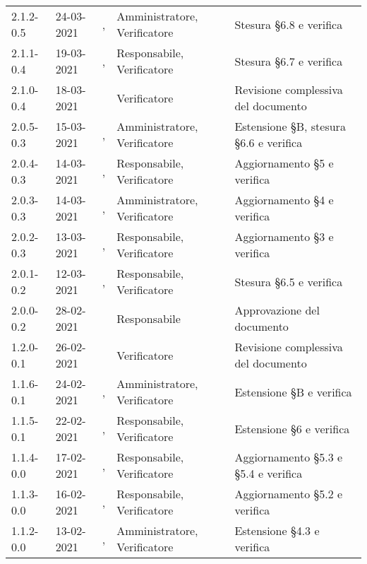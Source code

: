 {{\begin{longtable}{C{1.7cm} | C{2.2cm} | C{3.2cm} | C{3cm} | C{4.8cm}}
2.1.2-0.5 & 24-03-2021 & \PA{}, \BM{} & Amministratore, Verificatore & Stesura \S 6.8 e verifica\\

2.1.1-0.4 & 19-03-2021 & \SH{}, \BM{} & Responsabile, Verificatore & Stesura \S 6.7 e verifica\\

2.1.0-0.4 & 18-03-2021 & \BM{} & Verificatore & Revisione complessiva del documento\\

2.0.5-0.3 & 15-03-2021 & \SG{}, \RA{} & Amministratore, Verificatore & Estensione \S B, stesura \S 6.6 e verifica\\

2.0.4-0.3 & 14-03-2021 & \ZM{}, \BM{} & Responsabile, Verificatore & Aggiornamento \S 5 e verifica\\

2.0.3-0.3 & 14-03-2021 & \BM{}, \RA{} & Amministratore, Verificatore & Aggiornamento \S 4 e verifica\\

2.0.2-0.3 & 13-03-2021 & \ZM{}, \SG{} & Responsabile, Verificatore & Aggiornamento \S 3 e verifica\\

2.0.1-0.2 & 12-03-2021 & \ZM{}, \SG{} & Responsabile, Verificatore & Stesura \S 6.5 e verifica\\

2.0.0-0.2 & 28-02-2021 & \ZM{} & Responsabile & Approvazione del documento\\

1.2.0-0.1 & 26-02-2021 & \SP{} & Verificatore & Revisione complessiva del documento\\

1.1.6-0.1 & 24-02-2021 & \SG{}, \SP{} & Amministratore, Verificatore & Estensione \S B e verifica\\

1.1.5-0.1 & 22-02-2021 & \ZM{}, \SP{} & Responsabile, Verificatore & Estensione \S 6 e verifica\\

1.1.4-0.0 & 17-02-2021 & \PA{}, \ZM{} & Responsabile, Verificatore & Aggiornamento \S 5.3 e \S 5.4 e verifica\\

1.1.3-0.0 & 16-02-2021 & \PA{}, \ZM{} & Responsabile, Verificatore & Aggiornamento \S 5.2 e verifica\\

1.1.2-0.0 & 13-02-2021 & \BM{}, \ZM{} & Amministratore, Verificatore & Estensione \S 4.3 e verifica\\


\end{longtable}}}
